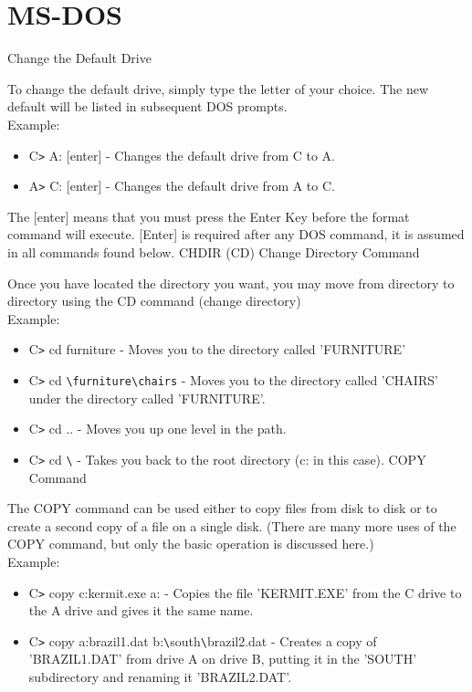 \documentclass[11pt,a4paper,twoside]{article}
\begin{document}
\section{MS-DOS}
Change the Default Drive\par
To change the default drive, simply type the letter of your choice. The new default will be listed in subsequent DOS prompts.\\
Example:
\begin{itemize}
    \item C\verb=>= A: [enter] - Changes the default drive from C to A.
\item A\verb=>= C: [enter] - Changes the default drive from A to C.
\end{itemize}
The [enter] means that you must press the Enter Key before the format command will execute. [Enter] is required after any DOS command, it is assumed in all commands found below.
CHDIR (CD) Change Directory Command\par
Once you have located the directory you want, you may move from directory to directory using the CD command (change directory)\\
Example:
\begin{itemize}
    \item C\verb=>= cd furniture - Moves you to the directory called 'FURNITURE'
\item C\verb=>= cd \verb=\furniture=\verb=\chairs= - Moves you to the directory called 'CHAIRS' under the directory called 'FURNITURE'.
\item C\verb=>= cd .. - Moves you up one level in the path.
\item C\verb=>= cd \verb=\= - Takes you back to the root directory (c: in this case).
COPY Command
\end{itemize}
The COPY command can be used either to copy files from disk to disk or to create a second copy of a file on a single disk. (There are many more uses of the COPY command, but only the basic operation is discussed here.)\\
Example:
\begin{itemize}
    \item C\verb=>= copy c:kermit.exe a: - Copies the file 'KERMIT.EXE' from the C drive to the A drive and gives it the same name.
\item C\verb=>= copy a:brazil1.dat b:\verb=\=south\verb=\=brazil2.dat - Creates a copy of 'BRAZIL1.DAT' from drive A on drive B, putting it in the 'SOUTH' subdirectory and renaming it 'BRAZIL2.DAT'.
\end{itemize}
\end{document}
